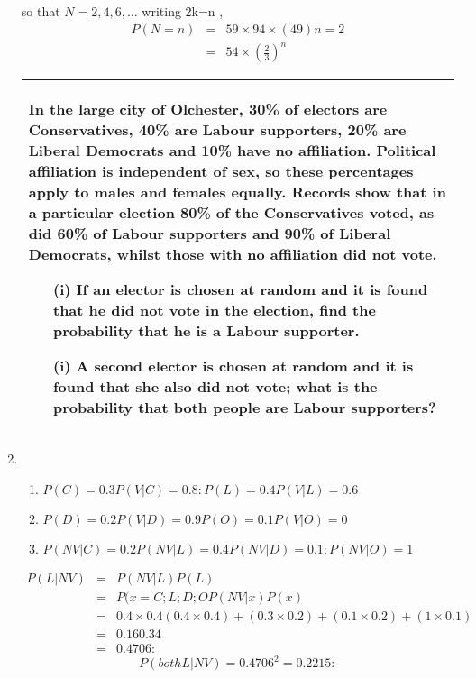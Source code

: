 \documentclass[a4paper,12pt]{article}
\begin{document}
\begin{enumerate}
so that $N=2,4,6,\ldots$
writing 2k=n ,
\begin{eqnarray*} P(N = n) &=& 5
9 \times  9
4 \times  ( 4
9 )n=2 \\ &=&  5
4 \times  \left( \frac{2}{3} \right)^n
\end{eqnarray*}

\newpage    
  \begin{table}[ht!]
     \centering
     \begin{tabular}{|p{15cm}|}
     \hline  
In the large city of Olchester, 30\% of electors are Conservatives, 40\% are Labour supporters, 20\% are Liberal Democrats and 10\% have no affiliation.  Political affiliation is independent of sex, so these percentages apply to males and females equally.  Records show that in a particular election 80\% of the Conservatives voted, as did 60\% of Labour supporters and 90\% of Liberal Democrats, whilst those with no affiliation did not vote.  

\begin{itemize}
\item[(i)]If an elector is chosen at random and it is found that he did not vote in the election, find the probability that he is a Labour supporter.  
 
\item[(i)]A second elector is chosen at random and it is found that she also did not vote;  what is the probability that both people are Labour supporters? 
\end{itemize}
\\ \hline 
 \end{tabular}
    \end{table}
\item

\begin{enumerate}
    \item $P(C) = 0.3 P(V |C) = 0.8: P(L) = 0.4 P(V | L) = 0.6$
    \item $P(D) = 0.2 P(V |D) = 0.9 P(O) = 0.1 P(V |O) = 0$
    \item $P(NV |C) = 0.2 P(NV |L) = 0.4 P(NV |D) = 0.1; P(NV |O) = 1$
\end{enumerate}
\begin{eqnarray*}
P(L|NV ) &=& P(NV |L)P(L)\\ 
&=&
P(x=C;L;D;OP(NV |x)P(x)\\
&=& 0.4\times 0.4
(0.4\times 0.4)+(0.3\times 0.2)+(0.1\times 0.2)+(1\times 0.1)\\ &=& 0.16
0.34 \\ &=& 0.4706:
\end{eqnarray*}
\[P(both L|NV ) = 0.4706^2 = 0.2215:\]

\end{enumerate}
\end{document}
